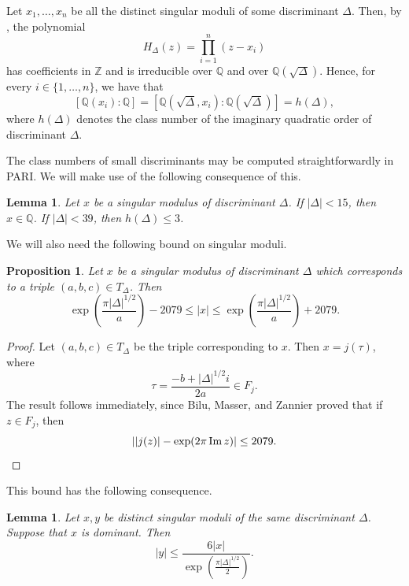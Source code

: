 \documentclass[11pt,a4paper, british]{amsart}
\newtheorem{prop}[thm]{Proposition}
\newtheorem{lem}[thm]{Lemma}
\theoremstyle{definition}
\theoremstyle{remark}
\numberwithin{equation}{section}
\newcommand{\Q}{\mathbb{Q}} %
\newcommand{\Z}{\mathbb{Z}} %
\DeclareMathOperator{\im}{Im} %
\begin{document}
 Let $x_1, \ldots, x_n$ be all the distinct singular moduli of some discriminant $\Delta$. Then, by \cite[Theorem 11.1 \& Proposition 13.2]{Cox22}, the polynomial
 \[ H_\Delta(z) = \prod_{i=1}^n (z- x_i)\]
 has coefficients in $\Z$ and is irreducible over $\Q$ and over $\Q(\sqrt{\Delta})$.
 Hence, for every $i \in \{1, \ldots, n\}$, we have that
\[ [\Q(x_i) : \Q] = \left[\Q\left(\sqrt{\Delta}, x_i\right) : \Q\left(\sqrt{\Delta}\right)\right] = h(\Delta),\]
where $h(\Delta)$ denotes the class number of the imaginary quadratic order of discriminant $\Delta$.

The class numbers of small discriminants may be computed straightforwardly in PARI. We will make use of the following consequence of this.

\begin{lem}\label{lem:smallclass}
	Let $x$ be a singular modulus of discriminant $\Delta$. If $\lvert \Delta \rvert < 15$, then $x \in \Q$. If $\lvert \Delta \rvert < 39$, then $h(\Delta)  \leq 3$.
\end{lem}

We will also need the following bound on singular moduli.

\begin{prop}\label{prop:bd}
	Let $x$ be a singular modulus of discriminant $\Delta$ which corresponds to a triple $(a, b, c) \in T_\Delta$. Then
	\[ \exp\left(\frac{\pi \lvert \Delta \rvert^{1/2}}{a}\right) - 2079 \leq \lvert x \rvert \leq \exp\left(\frac{\pi \lvert \Delta \rvert^{1/2}}{a}\right) + 2079.\]
\end{prop}

\begin{proof}
Let $(a, b, c) \in T_\Delta$ be the triple  corresponding to $x$. Then $x = j(\tau)$, where
	\[ \tau = \frac{-b + \lvert \Delta \rvert^{1/2} i}{2 a} \in F_j. \]
	The result follows immediately, since Bilu, Masser, and Zannier \cite[Lemma~1]{BiluMasserZannier13} proved that if $z \in F_j$, then
	\[ \left\lvert \left\lvert j(z) \right\rvert - \exp(2 \pi \im z) \right\rvert \leq 2079.\qedhere\] 
\end{proof}

This bound has the following consequence.

\begin{lem}\label{lem:dombig}
	Let $x, y$ be distinct singular moduli of the same discriminant $\Delta$. Suppose that $x$ is dominant. Then
	\[\lvert y \rvert \leq \frac{6 \lvert x \rvert}{\exp\left(\frac{\pi \lvert \Delta \rvert^{1/2}}{2}\right)}.\]
\end{lem}
\end{document}
